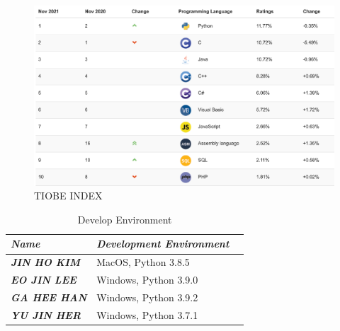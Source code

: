 \documentclass[conference]{IEEEtran}
\begin{document}
\begin{figure}[]
\centerline{\includegraphics{그림12png.png}}
\caption{TIOBE INDEX}
\label{fig}
\end{figure}


\begin{table}[ht]
    \centering
    \begin{tabularx}{\columnwidth}{X|X}
    \hline
    \textit{\textbf{Name}} & \textit{\textbf{Development Environment}}
     & & \\ \hline
    \textit{\textbf{JIN HO KIM}} & MacOS, Python 3.8.5    
     & & \\ \hline
    \textit{\textbf{EO JIN LEE}} & Windows, Python 3.9.0
     & & \\ \hline
    \textit{\textbf{GA HEE HAN}} & Windows, Python 3.9.2
     & & \\ \hline
    \textit{\textbf{YU JIN HER}} & Windows, Python 3.7.1
     & & \\ \hline
    \end{tabularx}
    \renewcommand{\thetable}{\arabic{table}}
    \caption{Develop Environment}
    \label{tab:table}
\end{table}
\end{document}
